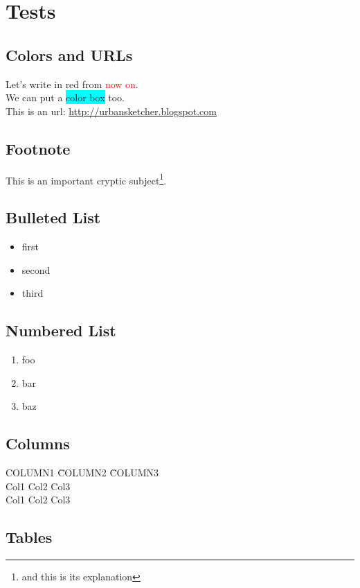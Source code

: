 \section{Tests}

\subsection{Colors and URLs}
Let's write in red from \textcolor{red}{now on}.\\
We can put a \colorbox{cyan}{color box} too.\\
This is an url: \url{http://urbansketcher.blogspot.com}

\subsection{Footnote}
This is an important cryptic subject\footnote{and this is its explanation}.

\subsection{Bulleted List}
\begin{itemize}
	\item first
	\item second
	\item third
\end{itemize}

\subsection{Numbered List}
\begin{enumerate}
	\item foo
	\item bar
	\item baz
\end{enumerate}

\subsection{Columns}
\begin{tabbing}
	COLUMN1	\=COLUMN2	\=COLUMN3\\
	Col1	\>Col2		\>Col3\\
	Col1	\>Col2		\>Col3
\end{tabbing}

\subsection{Tables}

